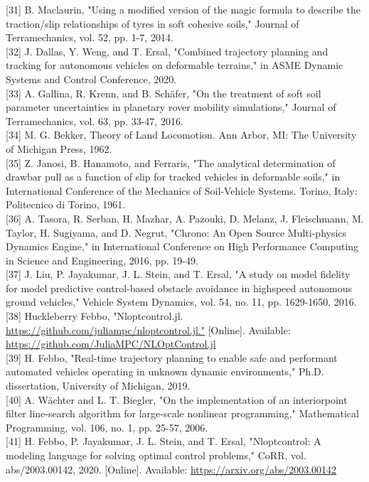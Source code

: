 \documentclass[10pt]{article}
\begin{document}
[31] B. Maclaurin, "Using a modified version of the magic formula to describe the traction/slip relationships of tyres in soft cohesive soils," Journal of Terramechanics, vol. 52, pp. 1-7, 2014.\\[0pt]
[32] J. Dallas, Y. Weng, and T. Ersal, "Combined trajectory planning and tracking for autonomous vehicles on deformable terrains," in ASME Dynamic Systems and Control Conference, 2020.\\[0pt]
[33] A. Gallina, R. Krenn, and B. Schäfer, "On the treatment of soft soil parameter uncertainties in planetary rover mobility simulations," Journal of Terramechanics, vol. 63, pp. 33-47, 2016.\\[0pt]
[34] M. G. Bekker, Theory of Land Locomotion. Ann Arbor, MI: The University of Michigan Press, 1962.\\[0pt]
[35] Z. Janosi, B. Hanamoto, and Ferraris, "The analytical determination of drawbar pull as a function of slip for tracked vehicles in deformable soils," in International Conference of the Mechanics of Soil-Vehicle Systems. Torino, Italy: Politecnico di Torino, 1961.\\[0pt]
[36] A. Tasora, R. Serban, H. Mazhar, A. Pazouki, D. Melanz, J. Fleischmann, M. Taylor, H. Sugiyama, and D. Negrut, "Chrono: An Open Source Multi-physics Dynamics Engine," in International Conference on High Performance Computing in Science and Engineering, 2016, pp. 19-49.\\[0pt]
[37] J. Liu, P. Jayakumar, J. L. Stein, and T. Ersal, "A study on model fidelity for model predictive control-based obstacle avoidance in highspeed autonomous ground vehicles," Vehicle System Dynamics, vol. 54, no. 11, pp. 1629-1650, 2016.\\[0pt]
[38] Huckleberry Febbo, "Nloptcontrol.jl. \href{https://github.com/juliampc/nloptcontrol.jl.%22}{https://github.com/juliampc/nloptcontrol.jl."} [Online]. Available: \href{https://github.com/JuliaMPC/NLOptControl.jl}{https://github.com/JuliaMPC/NLOptControl.jl}\\[0pt]
[39] H. Febbo, "Real-time trajectory planning to enable safe and performant automated vehicles operating in unknown dynamic environments," Ph.D. dissertation, University of Michigan, 2019.\\[0pt]
[40] A. Wächter and L. T. Biegler, "On the implementation of an interiorpoint filter line-search algorithm for large-scale nonlinear programming," Mathematical Programming, vol. 106, no. 1, pp. 25-57, 2006.\\[0pt]
[41] H. Febbo, P. Jayakumar, J. L. Stein, and T. Ersal, "Nloptcontrol: A modeling language for solving optimal control problems," CoRR, vol. abs/2003.00142, 2020. [Online]. Available: \href{https://arxiv.org/abs/2003.00142}{https://arxiv.org/abs/2003.00142}\\[0pt]
\end{document}
